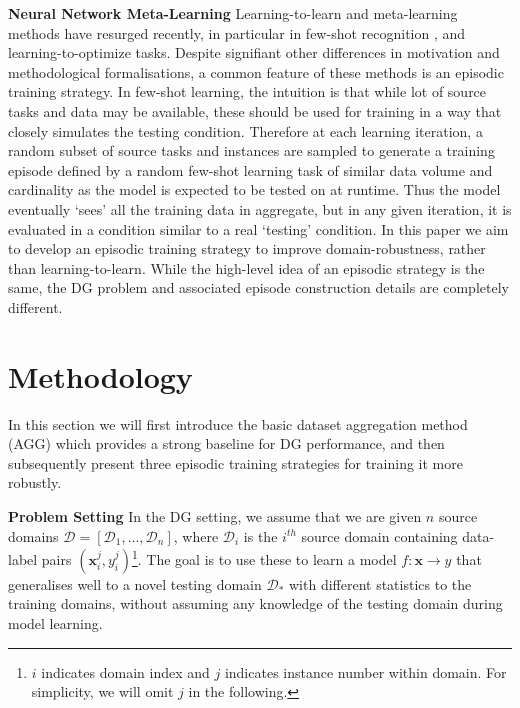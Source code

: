\documentclass[10pt,twocolumn,letterpaper]{article}
\newcommand{\keypoint}[1]{\vspace{0.1cm}\noindent\textbf{#1}\quad}
\newcommand{\cut}[1]{}
\begin{document}
\keypoint{Neural Network Meta-Learning} Learning-to-learn and meta-learning methods have resurged recently, in particular in few-shot recognition \cite{finn2017model,snell2017prototypicalNets,mishra2017metaTC}, and learning-to-optimize \cite{ravi2016optimization} tasks. Despite signifiant other differences in motivation and methodological formalisations, a common feature of these methods is an episodic training strategy. In few-shot learning, the intuition is that while lot of source tasks and data may be available, these should be used for training in a way that closely simulates the testing condition. Therefore at each learning iteration, a random subset of source tasks and instances are sampled to generate a training episode defined by a random few-shot learning task of similar data volume and cardinality as the model is expected to be tested on at runtime. Thus the model eventually `sees' all the training data in aggregate, but in any given iteration, it is evaluated in a condition similar to a real `testing' condition. In this paper we aim to develop an episodic training strategy to improve domain-robustness, rather than learning-to-learn. While the high-level idea of an episodic strategy is the same, the DG problem and associated episode construction details are completely different. 





\section{Methodology}


In this section we will first introduce the basic dataset aggregation method (AGG)  which provides a strong baseline for DG performance, and then subsequently present three episodic training strategies for training it more robustly.

\keypoint{Problem Setting} In the DG setting, we assume that we are given  $n$ source domains $\mathcal{D}=[\mathcal{D}_1, ..., \mathcal{D}_n]$, where $\mathcal{D}_{i}$ is the $i^{th}$\cut{($i \in [1, n]$)} source domain containing data-label pairs {$(\mathbf{x}_i^j, y_i^j)$\footnote{$i$ indicates domain index and $j$ indicates instance number within domain. For simplicity, we will omit $j$ in the following.}}. The goal is to use these to learn a model $f:\mathbf{x}\to y$ that generalises well to a novel testing domain $\mathcal{D}_*$ with different statistics to the training domains, without assuming any knowledge of the testing domain during model learning. 
\end{document}
